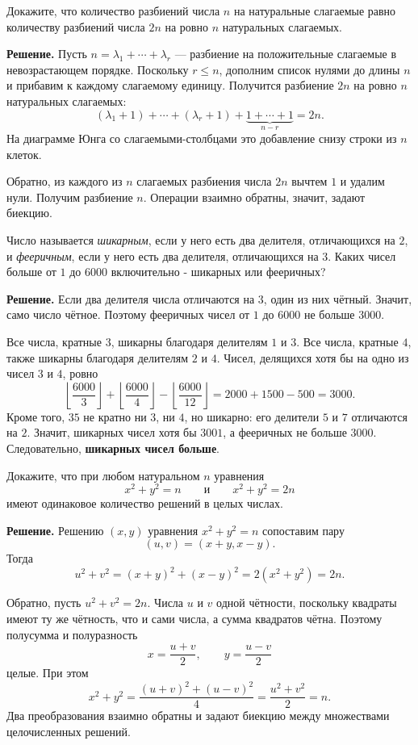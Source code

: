 \begin{problems}
\item Докажите, что количество разбиений числа $n$ на натуральные слагаемые равно количеству разбиений числа $2n$ на ровно $n$ натуральных слагаемых.
\par\smallskip\noindent\textbf{Решение.} Пусть $n=\lambda_1+\cdots+\lambda_r$ --- разбиение на положительные слагаемые в невозрастающем порядке. Поскольку $r\le n$, дополним список нулями до длины $n$ и прибавим к каждому слагаемому единицу. Получится разбиение $2n$ на ровно $n$ натуральных слагаемых:
\[
(\lambda_1+1)+\cdots+(\lambda_r+1)
+\underbrace{1+\cdots+1}_{n-r}=2n.
\]
На диаграмме Юнга со слагаемыми-столбцами это добавление снизу строки из $n$ клеток.
\par Обратно, из каждого из $n$ слагаемых разбиения числа $2n$ вычтем $1$ и удалим нули. Получим разбиение $n$. Операции взаимно обратны, значит, задают биекцию.\par

\item Число называется \emph{шикарным}, если у него есть два делителя, отличающихся на $2$, и \emph{фееричным}, если у него есть два делителя, отличающихся на $3$. Каких чисел больше от $1$ до $6000$ включительно - шикарных или фееричных?
\par\smallskip\noindent\textbf{Решение.} Если два делителя числа отличаются на $3$, один из них чётный. Значит, само число чётное. Поэтому фееричных чисел от $1$ до $6000$ не больше $3000$.
\par Все числа, кратные $3$, шикарны благодаря делителям $1$ и $3$. Все числа, кратные $4$, также шикарны благодаря делителям $2$ и $4$. Чисел, делящихся хотя бы на одно из чисел $3$ и $4$, ровно
\[
\left\lfloor\frac{6000}{3}\right\rfloor
+\left\lfloor\frac{6000}{4}\right\rfloor
-\left\lfloor\frac{6000}{12}\right\rfloor
=2000+1500-500=3000.
\]
Кроме того, $35$ не кратно ни $3$, ни $4$, но шикарно: его делители $5$ и $7$ отличаются на $2$. Значит, шикарных чисел хотя бы $3001$, а фееричных не больше $3000$. Следовательно, \textbf{шикарных чисел больше}.\par

\item Докажите, что при любом натуральном $n$ уравнения
\[
x^2+y^2=n
\qquad\text{и}\qquad
x^2+y^2=2n
\]
имеют одинаковое количество решений в целых числах.
\par\smallskip\noindent\textbf{Решение.} Решению $(x,y)$ уравнения $x^2+y^2=n$ сопоставим пару
\[
(u,v)=(x+y,x-y).
\]
Тогда
\[
u^2+v^2=(x+y)^2+(x-y)^2=2(x^2+y^2)=2n.
\]
\par Обратно, пусть $u^2+v^2=2n$. Числа $u$ и $v$ одной чётности, поскольку квадраты имеют ту же чётность, что и сами числа, а сумма квадратов чётна. Поэтому полусумма и полуразность
\[
x=\frac{u+v}{2},\qquad y=\frac{u-v}{2}
\]
целые. При этом
\[
x^2+y^2=\frac{(u+v)^2+(u-v)^2}{4}
=\frac{u^2+v^2}{2}=n.
\]
Два преобразования взаимно обратны и задают биекцию между множествами целочисленных решений.\par


\end{problems}

